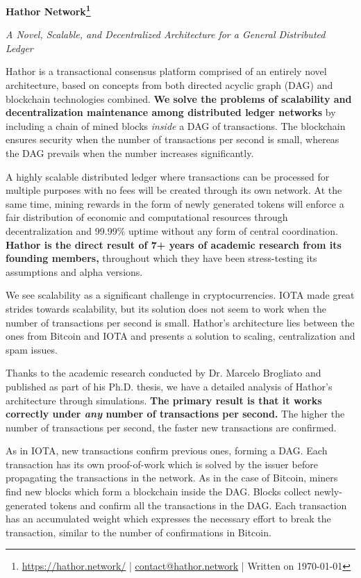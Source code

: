 \documentclass[12pt, a4paper]{article}
\begin{document}
\large
\noindent \textbf{Hathor Network\footnote{\url{https://hathor.network/} | \href{contact@hathor.network}{contact@hathor.network} | Written on \today}}

\normalsize
\noindent \emph{A Novel, Scalable, and Decentralized Architecture for a General Distributed Ledger}

\vspace{1em}

Hathor is a transactional consensus platform comprised of an entirely novel architecture, based on concepts from both directed acyclic graph (DAG) and blockchain technologies combined. \textbf{We solve the problems of scalability and decentralization maintenance among distributed ledger networks} by including a chain of mined blocks \emph{inside} a DAG of transactions. The blockchain ensures security when the number of transactions per second is small, whereas the DAG prevails when the number increases significantly.

A highly scalable distributed ledger where transactions can be processed for multiple purposes with no fees will be created through its own network. At the same time, mining rewards in the form of newly generated tokens will enforce a fair distribution of economic and computational resources through decentralization and 99.99\% uptime without any form of central coordination. \textbf{Hathor is the direct result of 7+ years of academic research from its founding members,} throughout which they have been stress-testing its assumptions and alpha versions.

We see scalability as a significant challenge in cryptocurrencies. IOTA made great strides towards scalability, but its solution does not seem to work when the number of transactions per second is small. Hathor’s architecture lies between the ones from Bitcoin and IOTA and presents a solution to scaling, centralization and spam issues.

Thanks to the academic research conducted by Dr. Marcelo Brogliato and published as part of his Ph.D. thesis, we have a detailed analysis of Hathor's architecture through simulations. \textbf{The primary result is that it works correctly under \emph{any} number of transactions per second.} The higher the number of transactions per second, the faster new transactions are confirmed.

As in IOTA, new transactions confirm previous ones, forming a DAG. Each transaction has its own proof-of-work which is solved by the issuer before propagating the transactions in the network. As in the case of Bitcoin, miners find new blocks which form a blockchain inside the DAG. Blocks collect newly-generated tokens and confirm all the transactions in the DAG. Each transaction has an accumulated weight which expresses the necessary effort to break the transaction, similar to the number of confirmations in Bitcoin.
\end{document}
